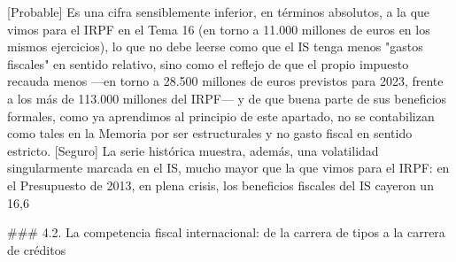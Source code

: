 \documentclass[10pt,a4paper]{article}
\begin{document}
[Probable] Es una cifra sensiblemente inferior, en términos absolutos, a la que vimos para el IRPF en el Tema 16 (en torno a 11.000 millones de euros en los mismos ejercicios), lo que no debe leerse como que el IS tenga menos "gastos fiscales" en sentido relativo, sino como el reflejo de que el propio impuesto recauda menos —en torno a 28.500 millones de euros previstos para 2023, frente a los más de 113.000 millones del IRPF— y de que buena parte de sus beneficios formales, como ya aprendimos al principio de este apartado, no se contabilizan como tales en la Memoria por ser estructurales y no gasto fiscal en sentido estricto. [Seguro] La serie histórica muestra, además, una volatilidad singularmente marcada en el IS, mucho mayor que la que vimos para el IRPF: en el Presupuesto de 2013, en plena crisis, los beneficios fiscales del IS cayeron un 16,6%

### 4.2. La competencia fiscal internacional: de la carrera de tipos a la carrera de créditos
\end{document}
